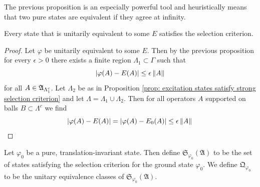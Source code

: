 \documentclass[11pt]{amsart}
\begin{document}
\begin{rmk}
    The previous proposition is an especially powerful tool and heuristically means that two pure states are equivalent if they agree at infinity. 
\end{rmk}
\begin{prop}
    Every state that is unitarily equivalent to some $E$ satisfies the selection criterion. 
    \begin{proof}
        Let $\varphi$ be unitarily equivalent to some $E$. Then by the previous proposition for every $\epsilon>0$ there exists a finite region $\Lambda_1\subset\Gamma$ such that
        \[
            |\varphi(A)-E(A)|\leq\epsilon\left\lVert A\right\rVert
        \]
        for all $A\in\mathfrak{A}_{\Lambda_1^c}$. Let $\Lambda_2$ be as in Proposition \ref{prop: excitation states satisfy strong selection criterion} and let $\Lambda=\Lambda_1\cup\Lambda_2$. Then for all operators $A$ supported on balls $B\subset\Lambda^c$ we find
        \[
            |\varphi(A)-E(A)|=|\varphi(A)-E_0(A)|\leq\epsilon\left\lVert A\right\rVert \\
        \]
    \end{proof}
\end{prop}
\begin{defn}
    Let $\varphi_0$ be a pure, translation-invariant state. Then define  $\mathfrak{S}_{\varphi_0}(\mathfrak A)$ to be the set of states satisfying the selection criterion for the ground state $\varphi_0$. We define $\mathfrak{Q}_{\varphi_0}$ to be the unitary equivalence classes of $\mathfrak{S}_{\varphi_0}(\mathfrak A)$.
\end{defn}
\end{document}
